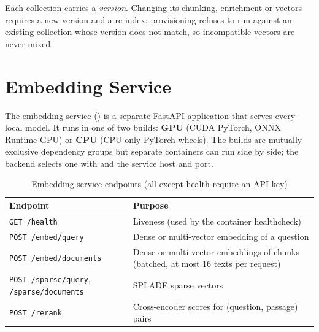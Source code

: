 \documentclass[11pt,letterpaper]{report}
\begin{document}
Each collection carries a \emph{version}. Changing its chunking, enrichment or vectors requires a new
version and a re-index; provisioning refuses to run against an existing collection whose version does
not match, so incompatible vectors are never mixed.

\chapter{Embedding Service}\label{ch:embedding}
The embedding service () is a separate FastAPI application that serves
every local model. It runs in one of two builds: \textbf{GPU} (CUDA PyTorch, ONNX Runtime GPU) or
\textbf{CPU} (CPU-only PyTorch wheels). The builds are mutually exclusive dependency groups but separate
containers can run side by side; the backend selects one with  and the
service host and port.

\begin{table}[H]
\centering
\caption{Embedding service endpoints (all except health require an API key)}\label{tab:embapi}
\begin{tabularx}{\textwidth}{@{}P{4.2cm}L@{}}
\toprule
\textbf{Endpoint} & \textbf{Purpose} \\
\midrule
\texttt{GET /health} & Liveness (used by the container healthcheck) \\
\texttt{POST /embed/query} & Dense or multi-vector embedding of a question \\
\texttt{POST /embed/documents} & Dense or multi-vector embeddings of chunks (batched, at most 16 texts per request) \\
\texttt{POST /sparse/query}, \texttt{/sparse/documents} & SPLADE sparse vectors \\
\texttt{POST /rerank} & Cross-encoder scores for (question, passage) pairs \\
\bottomrule
\end{tabularx}
\end{table}
\end{document}
